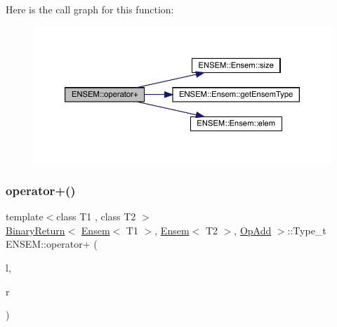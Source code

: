 Here is the call graph for this function\+:\nopagebreak
\begin{figure}[H]
\begin{center}
\leavevmode
\includegraphics[width=350pt]{d1/d9e/group__eensem_ga777c950dac5bc271c641c0f086f44ebf_cgraph}
\end{center}
\end{figure}
\mbox{\label{group__eensem_ga724a1c256d14ef567ac649b0ae8df485}} 
\subsubsection{\texorpdfstring{operator+()}{operator+()}\hspace{0.1cm}{\footnotesize\ttfamily [2/4]}}
{\footnotesize\ttfamily template$<$class T1 , class T2 $>$ \\
\mbox{\hyperlink{structENSEM_1_1BinaryReturn}{Binary\+Return}}$<$ \mbox{\hyperlink{classENSEM_1_1Ensem}{Ensem}}$<$ T1 $>$, \mbox{\hyperlink{classENSEM_1_1Ensem}{Ensem}}$<$ T2 $>$, \mbox{\hyperlink{structENSEM_1_1OpAdd}{Op\+Add}} $>$\+::Type\+\_\+t E\+N\+S\+E\+M\+::operator+ (\begin{DoxyParamCaption}\item[{const \mbox{\hyperlink{classENSEM_1_1Ensem}{Ensem}}$<$ T1 $>$ \&}]{l,  }\item[{const \mbox{\hyperlink{classENSEM_1_1Ensem}{Ensem}}$<$ T2 $>$ \&}]{r }\end{DoxyParamCaption})\hspace{0.3cm}{\ttfamily [inline]}}

